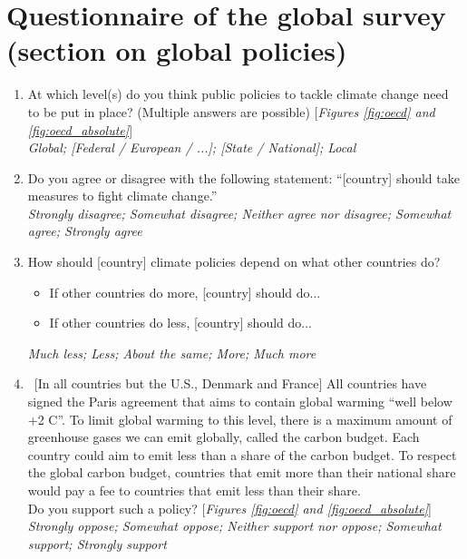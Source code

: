 \clearpage 
\section{Questionnaire of the global survey (section on global policies)}\label{app:questionnaire_oecd}
\renewcommand{\theenumi}{\Alph{enumi}}
\begin{enumerate} \item \label{q:scale} At which level(s) do you think public policies to tackle climate change need to be put in place? (Multiple answers are possible) [\textit{Figures \ref{fig:oecd} and \ref{fig:oecd_absolute}}]
\\ \textit{Global; [Federal / European / ...]; [State / National]; Local}
\item Do you agree or disagree with the following statement: ``[country] should take measures to fight climate change.''%
	\\ \textit{Strongly disagree; Somewhat disagree; Neither agree nor disagree; Somewhat agree; Strongly agree}
\item How should [country] climate policies depend on what other countries do?%
 \begin{itemize}
\item If other countries do more, [country] should do...
\item If other countries do less, [country] should do...
\end{itemize}
\textit{Much less; Less; About the same; More; Much more}
\item ~[In all countries but the U.S., Denmark and France]  All countries have signed the Paris agreement that aims to contain global warming ``well below +2 \textdegree{}C''. To limit global warming to this level, there is a maximum amount of greenhouse gases we can emit globally, called the carbon budget. Each country could aim to emit less than a share of the carbon budget. To respect the global carbon budget, countries that emit more than their national share would pay a fee to countries that emit less than their share. \\ 
Do you support such a policy? [\textit{Figures \ref{fig:oecd} and \ref{fig:oecd_absolute}}]
\\ \textit{Strongly oppose; Somewhat oppose; Neither support nor oppose; Somewhat support; Strongly support}

\end{enumerate}
